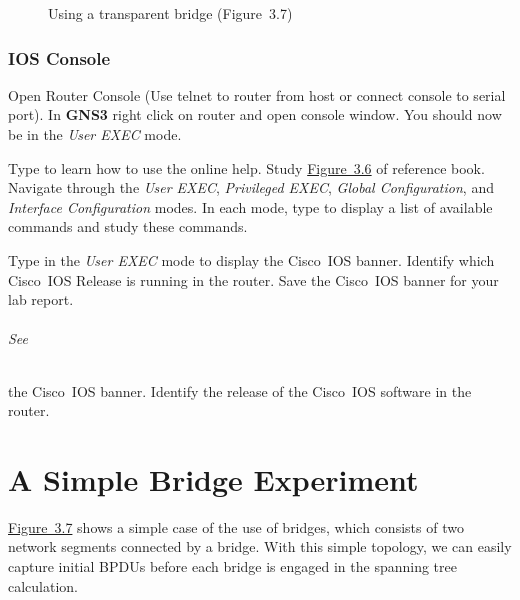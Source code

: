 \documentclass{../UTNetLab}
\begin{document}
\begin{figure}[H]
    \centering
    \caption{Using a transparent bridge (Figure~3.7)}\label{fig:3.7}
\end{figure}


\section{IOS Console}
Open Router Console (Use telnet to router from host or connect console to serial port).
In \textbf{GNS3} right click on router and open console window.
You should now be in the \textit{User EXEC} mode.

Type  to learn how to use the online help.
Study \hyperref[fig:3.6]{Figure~3.6} of reference book.
Navigate through the \textit{User EXEC}, \textit{Privileged EXEC}, \textit{Global Configuration}, and \textit{Interface Configuration} modes.
In each mode, type  to display a list of available commands and study these commands.

Type  in the \textit{User EXEC} mode to display the Cisco~IOS banner.
Identify which Cisco~IOS Release is running in the router.
Save the Cisco~IOS banner for your lab report.

\paragraph{See} the Cisco~IOS banner.
Identify the release of the Cisco~IOS software in the router.

\part{A Simple Bridge Experiment}
\hyperref[fig:3.7]{Figure~3.7} shows a simple case of the use of bridges, which consists of two network segments connected by a bridge.
With this simple topology, we can easily capture initial BPDUs before each bridge is engaged in the spanning tree calculation.
\end{document}
